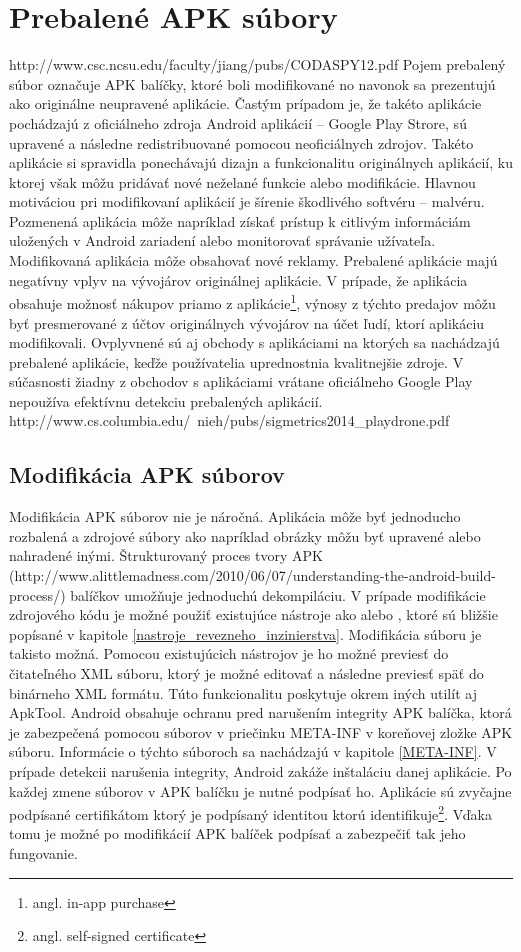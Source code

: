 \chapter{Prebalené APK súbory}
\label{Repackaged}
http://www.csc.ncsu.edu/faculty/jiang/pubs/CODASPY12.pdf
Pojem prebalený súbor označuje APK balíčky, ktoré boli modifikované no navonok sa prezentujú ako originálne neupravené aplikácie. Častým prípadom je, že takéto aplikácie pochádzajú z oficiálneho zdroja Android aplikácií – Google Play Strore, sú upravené a následne redistribuované pomocou neoficiálnych zdrojov. Takéto aplikácie si spravidla ponechávajú dizajn a funkcionalitu originálnych aplikácií, ku ktorej však môžu pridávať nové neželané funkcie alebo modifikácie. Hlavnou motiváciou pri modifikovaní aplikácií je šírenie škodlivého softvéru – malvéru. Pozmenená aplikácia môže napríklad získať prístup k citlivým informáciám uložených v Android zariadení alebo monitorovať správanie užívateľa. Modifikovaná aplikácia môže obsahovať nové reklamy. Prebalené aplikácie majú negatívny vplyv na vývojárov originálnej aplikácie. V prípade, že aplikácia obsahuje možnosť nákupov priamo z aplikácie\footnote{angl. in-app purchase}, výnosy z týchto predajov môžu byť presmerované z účtov originálnych vývojárov na účet ľudí, ktorí aplikáciu modifikovali. Ovplyvnené sú aj obchody s aplikáciami na ktorých sa nachádzajú prebalené aplikácie, keďže používatelia uprednostnia kvalitnejšie zdroje. V súčasnosti žiadny z obchodov s aplikáciami vrátane oficiálneho Google Play nepoužíva efektívnu detekciu prebalených aplikácií. http://www.cs.columbia.edu/~nieh/pubs/sigmetrics2014\_playdrone.pdf

\section{Modifikácia APK súborov}
Modifikácia APK súborov nie je náročná. Aplikácia môže byť jednoducho rozbalená a zdrojové súbory ako napríklad obrázky môžu byť upravené alebo nahradené inými.  Štrukturovaný proces tvory APK (http://www.alittlemadness.com/2010/06/07/understanding-the-android-build-process/) balíčkov umožňuje jednoduchú dekompiláciu. V prípade modifikácie zdrojového kódu je možné použiť existujúce nástroje ako  alebo , ktoré sú bližšie popísané v kapitole \ref{nastroje_revezneho_inzinierstva}. Modifikácia súboru  je takisto možná. Pomocou existujúcich nástrojov je ho možné previesť do čitateľného XML súboru, ktorý je možné editovať a následne previesť späť do binárneho XML formátu. Túto funkcionalitu poskytuje okrem iných utilít aj ApkTool.
Android obsahuje ochranu pred narušením integrity APK balíčka, ktorá je zabezpečená pomocou súborov v priečinku META-INF v koreňovej zložke APK súboru. Informácie o týchto súboroch sa nachádzajú v kapitole \ref{META-INF}. V prípade detekcii narušenia integrity, Android zakáže inštaláciu danej aplikácie. Po každej zmene súborov v APK balíčku je nutné podpísať ho. Aplikácie sú zvyčajne podpísané certifikátom ktorý je podpísaný identitou ktorú identifikuje\footnote{angl. self-signed certificate}. Vďaka tomu je možné po modifikácií APK balíček podpísať a zabezpečiť tak jeho fungovanie.

